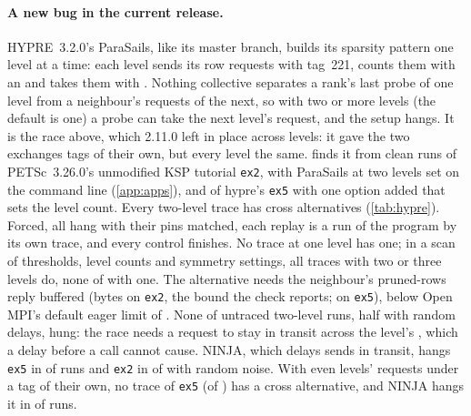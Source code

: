 \paragraph{A new bug in the current release.} HYPRE~3.2.0's ParaSails, like its master branch,
builds its sparsity pattern one level at a time: each level sends its row requests with
tag~221, counts them with an  and takes them with
. Nothing collective separates a rank's last probe of one level
from a neighbour's requests of the next, so with two or more levels (the default is one) a probe
can take the next level's request, and the setup hangs. It is the race above, which 2.11.0 left
in place across levels: it gave the two exchanges tags of their own, but every level the same.
\tool finds it from clean runs of PETSc~3.26.0's unmodified KSP tutorial \texttt{ex2}, with
ParaSails at two levels set on the command line (\cref{app:apps}), and of hypre's \texttt{ex5}
with one option added that sets the level count. Every two-level trace has cross alternatives
(\cref{tab:hypre}). Forced, all \nHypreNewAllCrossAlts hang with their pins matched, each replay
is a run of the program by its own trace, and every control finishes. No trace at one level has
one; in a scan of thresholds, level counts and symmetry settings, all \nPetscScanMultiTraced
traces with two or three levels do, none of \nPetscScanOneTraced with one. The alternative needs
the neighbour's pruned-rows reply buffered (\BPetscCross bytes on \texttt{ex2}, the bound the
check reports; \BHypreNewReply on \texttt{ex5}), below Open MPI's default eager limit of
\BimplOMPI. None of \nHypreNewAllStressRuns untraced two-level runs, half with random delays,
hung: the race needs a request to stay in transit across the level's , which
a delay before a call cannot cause. NINJA, which delays sends in transit, hangs \texttt{ex5} in
\nNinjaHypreNewHang of \nNinjaHypreNewRuns runs and \texttt{ex2} in \nNinjaPetscRandomHang of
\nNinjaPetscRandomRuns with random noise. With even levels' requests under a tag of their own,
no trace of \texttt{ex5} (of \nHypreNewFixTraced) has a cross alternative, and NINJA hangs it in
\nNinjaHypreNewFixHang of \nNinjaHypreNewFixRuns runs.

